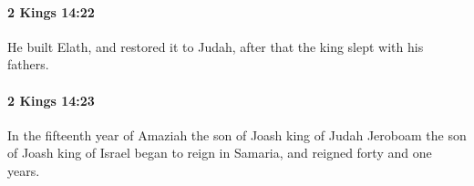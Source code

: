 		\paragraph{2 Kings 14:22} %
			\label{2KINGS-14-22}

			He built Elath, and restored it to Judah, after that the king slept with his fathers.


		\paragraph{2 Kings 14:23} %
			\label{2KINGS-14-23}

			In the fifteenth year of Amaziah the son of Joash king of Judah Jeroboam the son of Joash king of Israel began to reign in Samaria, and reigned forty and one years.


